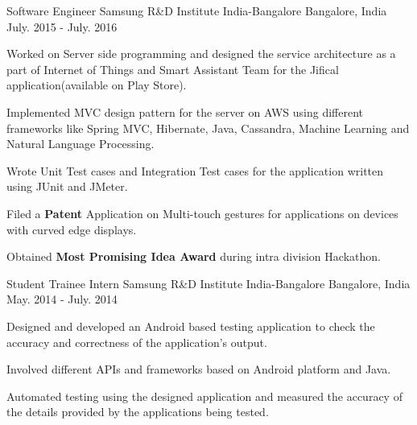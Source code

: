 \begin{cventries}
  \cventry
    {Software Engineer}
    {Samsung R\&D Institute India-Bangalore}
    {Bangalore, India}
    {July. 2015 - July. 2016}
    {
      \begin{cvitems}
        \item {Worked on Server side programming and designed the service architecture as a part of Internet of Things and Smart Assistant Team for the Jifical application(available on Play Store).}
        \item {Implemented MVC design pattern for the server on AWS using different frameworks like Spring MVC, Hibernate, Java, Cassandra, Machine Learning and Natural Language Processing.}
        \item {Wrote Unit Test cases and Integration Test cases for the application written using JUnit and JMeter.}
        \item{Filed a \textbf{Patent} Application on Multi-touch gestures for applications on devices with curved edge displays.}
        \item{Obtained \textbf{Most Promising Idea Award} during intra division Hackathon.}
      \end{cvitems}
    }
  \cventry
    {Student Trainee Intern}
    {Samsung R\&D Institute India-Bangalore}
    {Bangalore, India}
    {May. 2014 - July. 2014}
    {
      \begin{cvitems}
        \item {Designed and developed an Android based testing application to check the accuracy and correctness of the application's output.}
        \item {Involved different APIs and frameworks based on Android platform and Java.}
        \item{Automated testing using the designed application and measured the accuracy of the details provided by the applications being tested.}
      \end{cvitems}
    }

    
\end{cventries}
